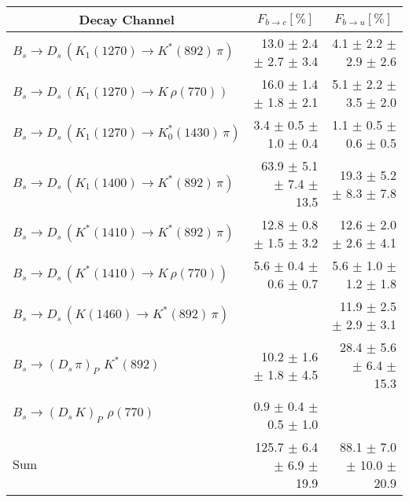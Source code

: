 \begin{tabular}{l r r } 
\hline
\hline
\multicolumn{1}{c}{Decay Channel} & \multicolumn{1}{c}{$F_{b \to c} [\%]$} & \multicolumn{1}{c}{$F_{b \to u} [\%]$}  \\ 
\hline
$B_s \to D_s \, ( K_1(1270) \to K^{*}(892) \, \pi )$ & 13.0 $\pm$ 2.4 $\pm$ 2.7 $\pm$ 3.4 & 4.1 $\pm$ 2.2 $\pm$ 2.9 $\pm$ 2.6 \\ 
$B_s \to D_s \, ( K_1(1270) \to K \, \rho(770) )$ & 16.0 $\pm$ 1.4 $\pm$ 1.8 $\pm$ 2.1 & 5.1 $\pm$ 2.2 $\pm$ 3.5 $\pm$ 2.0 \\ 
$B_s \to D_s \, ( K_1(1270) \to K^{*}_{0}(1430) \, \pi )$ & 3.4 $\pm$ 0.5 $\pm$ 1.0 $\pm$ 0.4 & 1.1 $\pm$ 0.5 $\pm$ 0.6 $\pm$ 0.5 \\ 
$B_s \to D_s \, ( K_1(1400) \to K^{*}(892) \, \pi )$ & 63.9 $\pm$ 5.1 $\pm$ 7.4 $\pm$ 13.5 & 19.3 $\pm$ 5.2 $\pm$ 8.3 $\pm$ 7.8 \\ 
$B_s \to D_s \, ( K^{*}(1410) \to K^{*}(892) \, \pi )$ & 12.8 $\pm$ 0.8 $\pm$ 1.5 $\pm$ 3.2 & 12.6 $\pm$ 2.0 $\pm$ 2.6 $\pm$ 4.1 \\ 
$B_s \to D_s \, ( K^{*}(1410) \to K \, \rho(770) )$ & 5.6 $\pm$ 0.4 $\pm$ 0.6 $\pm$ 0.7 & 5.6 $\pm$ 1.0 $\pm$ 1.2 $\pm$ 1.8 \\ 
$B_s \to D_s \, ( K(1460) \to K^{*}(892) \, \pi )$ &  & 11.9 $\pm$ 2.5 $\pm$ 2.9 $\pm$ 3.1 \\ 
$B_s \to ( D_s \, \pi)_{P} \, \, K^{*}(892)$ & 10.2 $\pm$ 1.6 $\pm$ 1.8 $\pm$ 4.5 & 28.4 $\pm$ 5.6 $\pm$ 6.4 $\pm$ 15.3 \\ 
$B_s \to ( D_s \, K)_{P} \, \, \rho(770)$ & 0.9 $\pm$ 0.4 $\pm$ 0.5 $\pm$ 1.0 &  \\ 
\hline
$\text{Sum}$ & 125.7 $\pm$ 6.4 $\pm$ 6.9 $\pm$ 19.9 & 88.1 $\pm$ 7.0 $\pm$ 10.0 $\pm$ 20.9 \\ 
\hline
\hline
\end{tabular}
